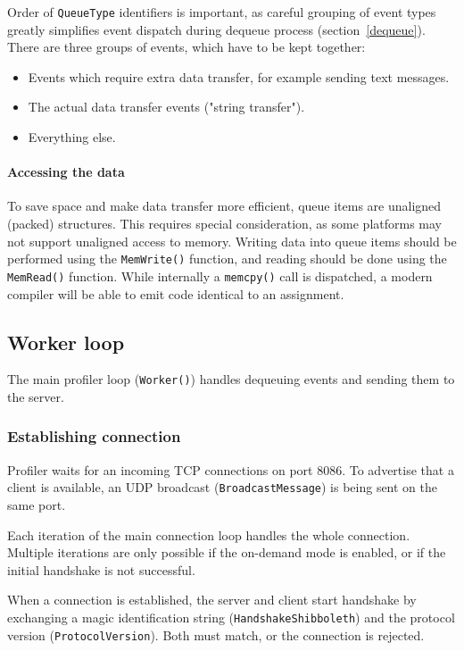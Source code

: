 \documentclass[hidelinks,titlepage,a4paper]{article}
\begin{document}
Order of \texttt{QueueType} identifiers is important, as careful grouping of event types greatly simplifies event dispatch during dequeue process (section~\ref{dequeue}). There are three groups of events, which have to be kept together:

\begin{itemize}
\item Events which require extra data transfer, for example sending text messages.
\item The actual data transfer events ("string transfer").
\item Everything else.
\end{itemize}

\paragraph{Accessing the data}
\label{accessingdata}

To save space and make data transfer more efficient, queue items are unaligned (packed) structures. This requires special consideration, as some platforms may not support unaligned access to memory. Writing data into queue items should be performed using the \texttt{MemWrite()} function, and reading should be done using the \texttt{MemRead()} function. While internally a \texttt{memcpy()} call is dispatched, a modern compiler will be able to emit code identical to an assignment.

\subsection{Worker loop}
\label{workerloop}

The main profiler loop (\texttt{Worker()}) handles dequeuing events and sending them to the server.

\subsubsection{Establishing connection}

Profiler waits for an incoming TCP connections on port 8086. To advertise that a client is available, an UDP broadcast (\texttt{BroadcastMessage}) is being sent on the same port.

Each iteration of the main connection loop handles the whole connection. Multiple iterations are only possible if the on-demand mode is enabled, or if the initial handshake is not successful.

When a connection is established, the server and client start handshake by exchanging a magic identification string (\texttt{HandshakeShibboleth}) and the protocol version (\texttt{ProtocolVersion}). Both must match, or the connection is rejected.
\end{document}
